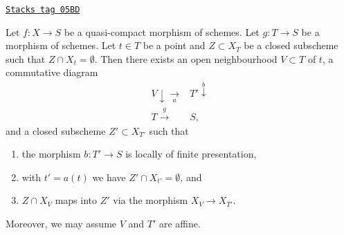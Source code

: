 \begin{lemma}[Separate]
\label{limits-lemma-separate}
\href{https://stacks.math.columbia.edu/tag/05BD}{\texttt{Stacks tag 05BD}}

Let $f : X \to S$ be a quasi-compact morphism of schemes.
Let $g : T \to S$ be a morphism of schemes.
Let $t \in T$ be a point and $Z \subset X_T$ be a closed
subscheme such that $Z \cap X_t = \emptyset$.
Then there exists an open neighbourhood
$V \subset T$ of $t$, a commutative diagram
$$
\begin{array}{cc}V \downarrow\underset{a}{\longrightarrow} & T' \overset{b}{\downarrow} \\ T \overset{g}{\longrightarrow} & S,\end{array}
$$
and a closed subscheme $Z' \subset X_{T'}$ such that
\begin{enumerate}
\item the morphism $b : T' \to S$ is locally of finite presentation,
\item with $t' = a(t)$ we have $Z' \cap X_{t'} = \emptyset$, and
\item $Z \cap X_V$ maps into $Z'$ via the morphism $X_V \to X_{T'}$.
\end{enumerate}
Moreover, we may assume $V$ and $T'$ are affine.
\end{lemma}

